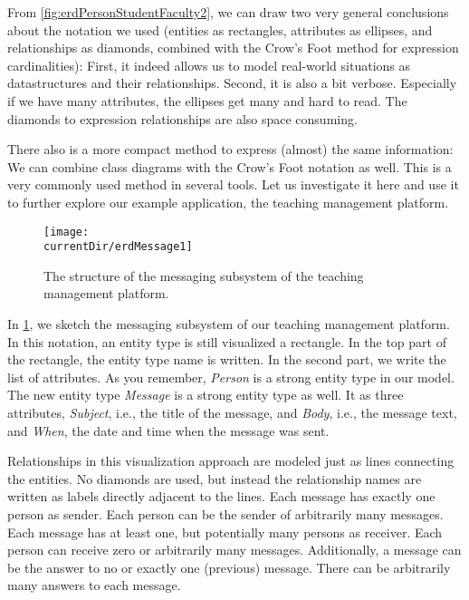 %
\label{sec:compactCrowsFootNotation}%
%
From \cref{fig:erdPersonStudentFaculty2}, we can draw two very general conclusions about the notation we used (entities as rectangles, attributes as ellipses, and relationships as diamonds, combined with the Crow's Foot method for expression cardinalities):
First, it indeed allows us to model real-world situations as datastructures and their relationships.
Second, it is also a bit verbose.
Especially if we have many attributes, the ellipses get many and hard to read.
The diamonds to expression relationships are also space consuming.

There also is a more compact method to express (almost) the same information:
We can combine  class diagrams with the Crow's Foot notation as well.
This is a very commonly used method in several tools.
Let us investigate it here and use it to further explore our example application, the teaching management platform.
%
\begin{figure}%
\centering%
\texttt{[image: \\currentDir/erdMessage1]}%
\caption{The structure of the messaging subsystem of the teaching management platform.}%
\label{fig:erdMessage1}%
\end{figure}%
%
In \cref{fig:erdMessage1}, we sketch the messaging subsystem of our teaching management platform.
In this notation, an entity type is still visualized a rectangle.
In the top part of the rectangle, the entity type name is written.
In the second part, we write the list of attributes.
As you remember, \emph{Person} is a strong entity type in our model.
The new entity type \emph{Message} is a strong entity type as well.
It as three attributes, \emph{Subject}, i.e., the title of the message, and \emph{Body}, i.e., the message text, and \emph{When}, the date and time when the message was sent.

Relationships in this visualization approach are modeled just as lines connecting the entities.
No diamonds are used, but instead the relationship names are written as labels directly adjacent to the lines.
Each message has exactly one person as sender.
Each person can be the sender of arbitrarily many messages.
Each message has at least one, but potentially many persons as receiver.
Each person can receive zero or arbitrarily many messages.
Additionally, a message can be the answer to no or exactly one (previous) message.
There can be arbitrarily many answers to each message.

